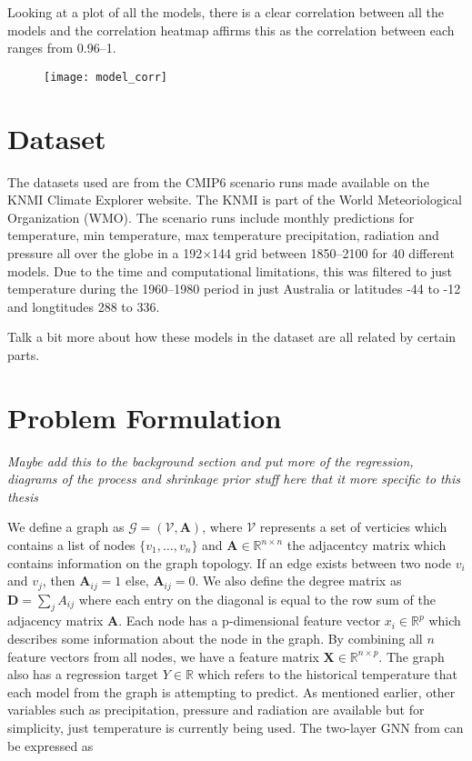 \documentclass[honours,12pt]{unswthesis}
\numberwithin{equation}{section}
\begin{document}
Looking at a plot of all the models, there is a clear correlation between all the models and the correlation heatmap affirms this as the correlation between each
ranges from 0.96--1. 

\begin{figure}[t]
    \texttt{[image: model\_corr]}
    \centering
\end{figure}

\section{Dataset}\label{data}
The datasets used are from the CMIP6 scenario runs made available on the KNMI Climate Explorer website. The KNMI is part of the
World Meteoriological Organization (WMO)\cite{}. The scenario runs include monthly predictions for temperature, min temperature, max temperature
precipitation, radiation and pressure all over the globe in a 192$\times$144 grid between 1850--2100 for 40 different models. Due to the time and computational
limitations, this was filtered to just temperature during the 1960--1980 period in just Australia or latitudes -44{\textdegree} to -12{\textdegree} 
and longtitudes 288{\textdegree} to 336{\textdegree}. 

Talk a bit more about how these models in the dataset are all related by certain parts.

{\section{Problem Formulation}}\label{problem-formulation}
\textit{Maybe add this to the background section and put more of the regression, diagrams of the process and shrinkage prior stuff here that it more specific to this thesis}

We define a graph as ${\mathcal{G}} = ({\mathcal{V}}, \textbf{A})$, where $\mathcal{V}$ represents a set of verticies which contains a list of nodes
$\{ v_1, \dots, v_n \}$ and $\textbf{A} \in \mathbb{R}^{n \times n}$ the adjacentcy matrix which contains information on the graph topology. If an edge exists
between two node $v_i$ and $v_j$, then $\textbf{A}_{ij} = 1$ else, $\textbf{A}_{ij} = 0$. We also define the degree matrix as $\mathbf{D} = \sum_{j}A_{ij}$
where each entry on the diagonal is equal to the row sum of the adjacency matrix $\textbf{A}$.  
Each node has a {p}-dimensional feature vector ${x_i} \in \mathbb{R}^{p}$
which describes some information about the node in the graph. By combining all ${n}$ feature vectors from all nodes, we have a feature matrix
$\textbf{X} \in \mathbb{R}^{n\times p}$. The graph also has a regression target ${Y} \in \mathbb{R}$ which refers to the historical temperature that each model from the
graph is attempting to predict. As mentioned earlier, other variables such as precipitation, pressure and radiation are available but for simplicity, just temperature
is currently being used. The two-layer GNN from \cite{kipf2017semisupervised} can be expressed as
\end{document}
